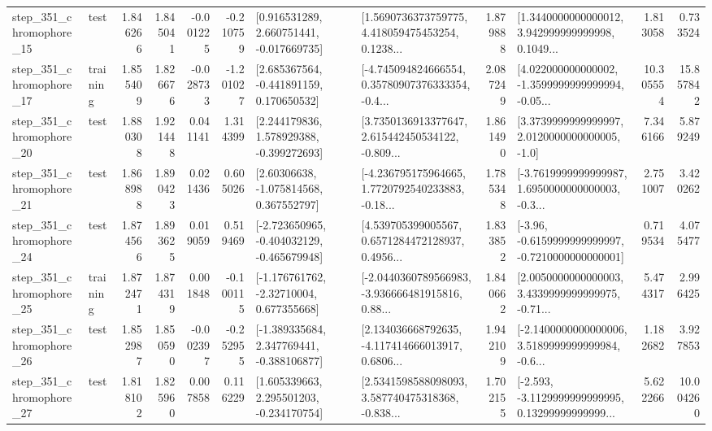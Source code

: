\begin{tabular}{llrrrrllrlrr}
  step\_351\_chromophore\_15 &      test &      1.846266 &    1.845041 &     -0.001225 & -0.210759 &    [0.916531289, 2.660751441, -0.017669735] &  [1.5690736373759775, 4.418059475453254, 0.1238... &       1.879888 &  [1.3440000000000012, 3.942999999999998, 0.1049... &            1.813058 &          0.733524 \\
  step\_351\_chromophore\_17 &  training &      1.855409 &    1.826676 &     -0.028733 & -1.201027 &    [2.685367564, -0.441891159, 0.170650532] &  [-4.745094824666554, 0.35780907376333354, -0.4... &       2.087249 &  [4.022000000000002, -1.3599999999999994, -0.05... &           10.305554 &         15.857842 \\
  step\_351\_chromophore\_20 &      test &      1.880308 &    1.921448 &      0.041141 &  1.314399 &    [2.244179836, 1.578929388, -0.399272693] &  [3.7350136913377647, 2.615442450534122, -0.809... &       1.861490 &     [3.3739999999999997, 2.0120000000000005, -1.0] &            7.346166 &          5.879249 \\
  step\_351\_chromophore\_21 &      test &      1.868988 &    1.890423 &      0.021436 &  0.605026 &     [2.60306638, -1.075814568, 0.367552797] &  [-4.236795175964665, 1.7720792540233883, -0.18... &       1.785348 &  [-3.7619999999999987, 1.6950000000000003, -0.3... &            2.751007 &          3.420262 \\
  step\_351\_chromophore\_24 &      test &      1.874566 &    1.893625 &      0.019059 &  0.519469 &  [-2.723650965, -0.404032129, -0.465679948] &  [4.539705399005567, 0.6571284472128937, 0.4956... &       1.833852 &  [-3.96, -0.6159999999999997, -0.7210000000000001] &            0.719534 &          4.075477 \\
  step\_351\_chromophore\_25 &  training &      1.872471 &    1.874319 &      0.001848 & -0.100115 &    [-1.176761762, -2.32710004, 0.677355668] &  [-2.0440360789566983, -3.936666481915816, 0.88... &       1.840662 &  [2.0050000000000003, 3.4339999999999975, -0.71... &            5.474317 &          2.996425 \\
  step\_351\_chromophore\_26 &      test &      1.852987 &    1.850590 &     -0.002397 & -0.252955 &   [-1.389335684, 2.347769441, -0.388106877] &  [2.134036668792635, -4.117414666013917, 0.6806... &       1.942109 &  [-2.1400000000000006, 3.5189999999999984, -0.6... &            1.182682 &          3.927853 \\
  step\_351\_chromophore\_27 &      test &      1.818102 &    1.825960 &      0.007858 &  0.116229 &    [1.605339663, 2.295501203, -0.234170754] &  [2.5341598588098093, 3.587740475318368, -0.838... &       1.702155 &  [-2.593, -3.1129999999999995, 0.13299999999999... &            5.622266 &         10.004260 \\

\end{tabular}
